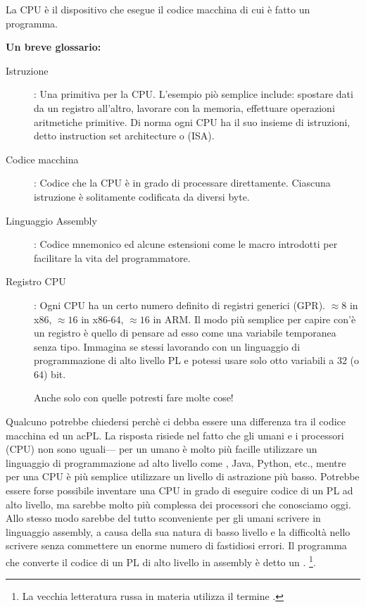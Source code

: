
La \ac{CPU} è il dispositivo che esegue il codice macchina di cui è fatto un programma.

\textbf{Un breve glossario:}

\begin{description}
\item[Istruzione]: Una primitiva per la \ac{CPU}.
L'esempio piò semplice include: spostare dati da un registro all'altro, lavorare con la memoria, effettuare operazioni aritmetiche primitive.
Di norma ogni \ac{CPU} ha il suo insieme di istruzioni, detto instruction set architecture o (\ac{ISA}).

\item[Codice macchina]: Codice che la \ac{CPU} è in grado di processare direttamente.
Ciascuna istruzione è solitamente codificata da diversi byte.
\item[Linguaggio Assembly]: Codice mnemonico ed alcune estensioni come le macro introdotti per facilitare la vita del programmatore.
\item[Registro CPU]: Ogni \ac{CPU} ha un certo numero definito di registri generici (\ac{GPR}).
$\approx 8$ in x86, $\approx 16$ in x86-64, $\approx 16$ in ARM.
Il modo più semplice per capire con'è un registro è quello di pensare ad esso come una variabile temporanea senza tipo.
Immagina se stessi lavorando con un linguaggio di programmazione di alto livello \ac{PL} e potessi usare solo otto variabili a 32 (o 64) bit.

Anche solo con quelle potresti fare molte cose!
\end{description}


Qualcuno potrebbe chiedersi perchè ci debba essere una differenza tra il codice macchina ed un ac{PL}. La risposta risiede nel fatto che gli umani e i processori (\ac{CPU}) non sono uguali---%
per un umano è molto più facille utilizzare un linguaggio di programmazione ad alto livello come \CCpp, Java, Python, etc., mentre per una \ac{CPU} è più semplice utilizzare un livello di astrazione più basso.
Potrebbe essere forse possibile inventare una \ac{CPU} in grado di eseguire codice di un \ac{PL} ad alto livello, ma sarebbe molto più complessa dei processori che conosciamo oggi.
Allo stesso modo sarebbe del tutto sconveniente per gli umani scrivere in linguaggio assembly, a causa della sua natura di basso livello e la difficoltà nello scrivere senza commettere un enorme numero di fastidiosi errori.
Il programma che converte il codice di un \ac{PL} di alto livello in assembly è detto un .
\footnote{La vecchia letteratura russa in materia utilizza il termine .}.

